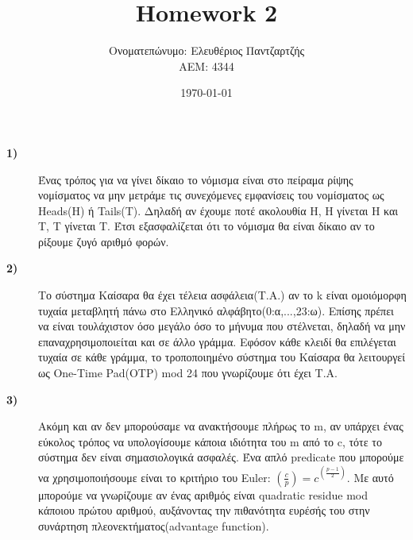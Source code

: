 \documentclass[12pt]{article}
\begin{document}
\centering
\title{Homework 2}
\author{Ονοματεπώνυμο: Ελευθέριος Παντζαρτζής \\  ΑΕΜ: 4344}
\date{\today}
\maketitle
\begin{description}
   \item [\textbf{1)}]  Ένας τρόπος για να γίνει δίκαιο το νόμισμα είναι στο πείραμα ρίψης νομίσματος να μην μετράμε τις συνεχόμενες εμφανίσεις του νομίσματος ως Heads(H) ή Tails(T). Δηλαδή αν έχουμε ποτέ ακολουθία H, H γίνεται H και T, T γίνεται T. Έτσι εξασφαλίζεται ότι το νόμισμα θα είναι δίκαιο αν το ρίξουμε ζυγό αριθμό φορών.
   \item [\textbf{2)}] Το σύστημα Καίσαρα θα έχει τέλεια ασφάλεια(Τ.Α.) αν το k είναι ομοιόμορφη τυχαία μεταβλητή πάνω στο Ελληνικό αλφάβητο(0:α,...,23:ω). Επίσης πρέπει να είναι τουλάχιστον όσο μεγάλο όσο το μήνυμα που στέλνεται, δηλαδή να μην επαναχρησιμοποιείται και σε άλλο γράμμα. Εφόσον κάθε κλειδί θα επιλέγεται τυχαία σε κάθε γράμμα, το τροποποιημένο σύστημα του Καίσαρα θα λειτουργεί ως One-Time Pad(OTP) mod 24 που γνωρίζουμε ότι έχει Τ.Α.
   \item [\textbf{3)}] Ακόμη και αν δεν μπορούσαμε να ανακτήσουμε πλήρως το m, αν υπάρχει ένας εύκολος τρόπος να υπολογίσουμε κάποια ιδιότητα του m από το c, τότε το σύστημα δεν είναι σημασιολογικά ασφαλές. Ένα απλό predicate που μπορούμε να χρησιμοποιήσουμε είναι το κριτήριο του Euler: $(\frac{c}{p})=c^{(\frac{p-1}{2})}$. Με αυτό μπορούμε να γνωρίζουμε αν ένας αριθμός είναι quadratic residue mod κάποιου πρώτου αριθμού, αυξάνοντας την πιθανότητα ευρέσής του στην συνάρτηση πλεονεκτήματος(advantage function).
\end{description}
\end{document}
